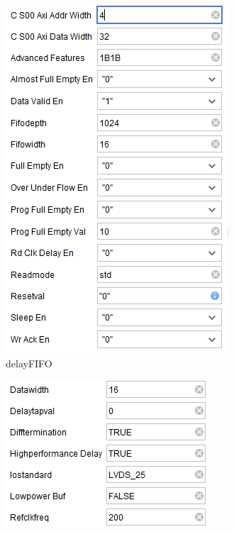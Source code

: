 \documentclass[11pt]{article}
\begin{document}
\begin{figure}[H]
	\centering
	\begin{subfigure}[t]{0.4\linewidth}
		\includegraphics[width=\linewidth]{images/default_param_delay_FIFO}
		\caption{delay\textunderscore FIFO}
	\end{subfigure}
	\begin{subfigure}[t]{0.4\linewidth}
		\includegraphics[width=\linewidth]{images/default_param_IDELAYBUFDS}

\end{subfigure}
\end{figure}
\end{document}
